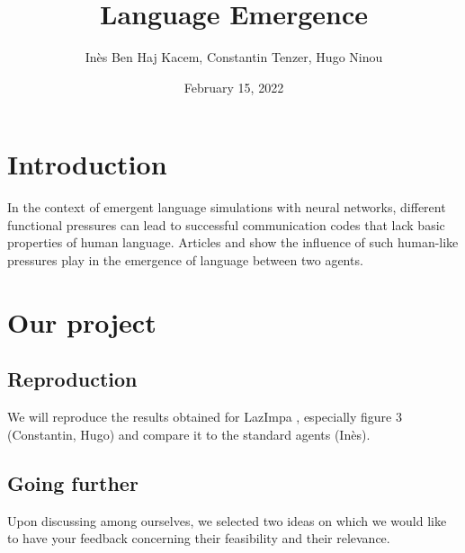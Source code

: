 \documentclass{amsart}
\date{February 15, 2022}
\title{Language Emergence}
\author{Inès Ben Haj Kacem, Constantin Tenzer, Hugo Ninou}
\theoremstyle{definition}
\theoremstyle{plain}
\begin{document}
\maketitle


\section{Introduction}

In the context of emergent language simulations with neural networks,
different functional pressures can lead to successful communication codes that lack basic properties of human language. Articles \cite{chaabouni2019anti} and \cite{rita2020lazimpa} show the influence of such human-like pressures play in the emergence of language between two agents. 

\section{Our project}

\subsection{Reproduction}

We will reproduce the results obtained for LazImpa \cite{rita2020lazimpa}, especially figure 3 (Constantin, Hugo) and compare it to the standard agents (Inès).
\\
\subsection{Going further}

Upon discussing among ourselves, we selected two ideas on which we would like to have your feedback concerning their feasibility and their relevance.\\
\end{document}
